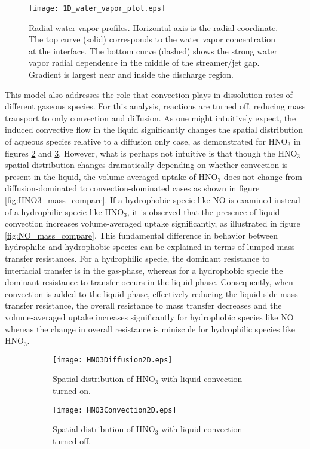 \documentclass[12pt]{article}
\begin{document}
\begin{figure}[htb]
    \centering
        \texttt{[image: 1D\_water\_vapor\_plot.eps]}
        \caption{Radial water vapor profiles. Horizontal axis is the radial coordinate. The top curve (solid) corresponds to the water vapor concentration at the interface. The bottom curve (dashed) shows the strong water vapor radial dependence in the middle of the streamer/jet gap. Gradient is largest near and inside the discharge region.}
        \label{fig:water_1D_profile}
\end{figure}

This model also addresses the role that convection plays in dissolution rates of different gaseous species. For this analysis, reactions are turned off, reducing mass transport to only convection and diffusion. As one might intuitively expect, the induced convective flow in the liquid significantly changes the spatial distribution of aqueous species relative to a diffusion only case, as demonstrated for HNO$_3$ in figures \ref{fig:HNO3_convec} and \ref{fig:HNO3_diffus}. However, what is perhaps not intuitive is that though the HNO$_3$ spatial distribution changes dramatically depending on whether convection is present in the liquid, the volume-averaged uptake of HNO$_3$ does not change from diffusion-dominated to convection-dominated cases as shown in figure \ref{fig:HNO3_mass_compare}. If a hydrophobic specie like NO is examined instead of a hydrophilic specie like HNO$_3$, it is observed that the presence of liquid convection increases volume-averaged uptake significantly, as illustrated in figure \ref{fig:NO_mass_compare}. This fundamental difference in behavior between hydrophilic and hydrophobic species can be explained in terms of lumped mass transfer resistances. For a hydrophilic specie, the dominant resistance to interfacial transfer is in the gas-phase, whereas for a hydrophobic specie the dominant resistance to transfer occurs in the liquid phase. \cite[p. 249]{carberry2001chemical} Consequently, when convection is added to the liquid phase, effectively reducing the liquid-side mass transfer resistance, the overall resistance to mass transfer decreases and the volume-averaged uptake increases significantly for hydrophobic species like NO whereas the change in overall resistance is miniscule for hydrophilic species like HNO$_3$.

\begin{figure}[htpb]
    \centering
    \begin{subfigure}[b]{.7\textwidth}
        \texttt{[image: HNO3Diffusion2D.eps]}
        \caption{Spatial distribution of HNO$_3$ with liquid convection turned on.}
        \label{fig:HNO3_convec}
    \end{subfigure}
    \begin{subfigure}[b]{.7\textwidth}
        \texttt{[image: HNO3Convection2D.eps]}
        \caption{Spatial distribution of HNO$_3$ with liquid convection turned off.}
        \label{fig:HNO3_diffus}
    \end{subfigure}
    \caption{}
    \label{fig:HNO3}
\end{figure}
\end{document}

